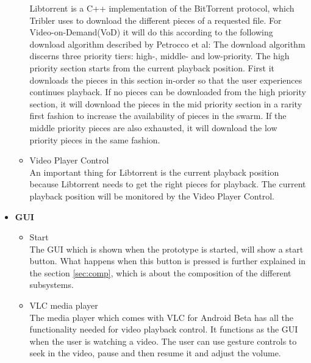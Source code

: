 \begin{itemize}
\begin{itemize}
Libtorrent is a C++ implementation of the BitTorrent protocol, which Tribler uses to download the different pieces of a requested file. For Video-on-Demand(VoD) it will do this according to the following download algorithm described by Petrocco et al\cite{libswift12}: The download algorithm discerns three priority tiers: high-, middle- and low-priority. The high priority section starts from the current playback position. First it downloads the pieces in this section in-order so that the user experiences continues playback. If no pieces can be downloaded from the high priority section, it will download the pieces in the mid priority section in a rarity first fashion to increase the availability of pieces in the swarm. If the middle priority pieces are also exhausted, it will download the low priority pieces in the same fashion. 
		\item Video Player Control\\
An important thing for Libtorrent is the current playback position because Libtorrent needs to get the right pieces for playback. The current playback position will be monitored by the Video Player Control.
	\end{itemize}
\item \textbf{GUI}
	\begin{itemize}
		\item Start\\
The GUI which is shown when the prototype is started, will show a start button. What happens when this button is pressed is further explained in the section \ref{sec:comp}, which is about the composition of the different subsystems.
		\item VLC media player\\
The media player which comes with VLC for Android Beta has all the functionality needed for video playback control. It functions as the GUI when the user is watching a video. The user can use gesture controls to seek in the video, pause and then resume it and adjust the volume.
	\end{itemize}
\end{itemize}
